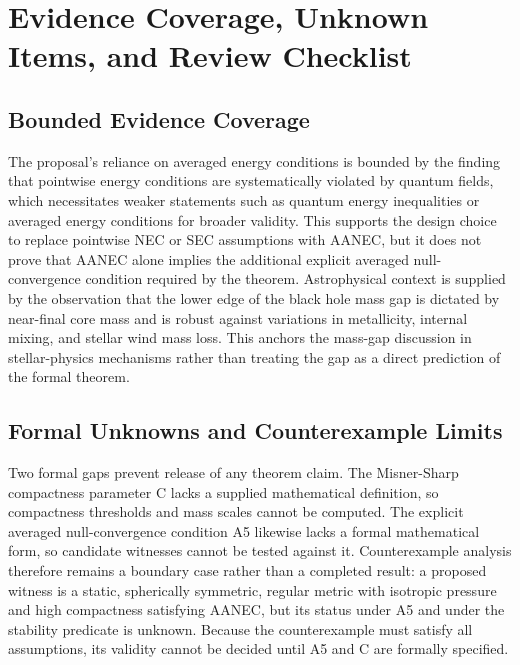 \documentclass[conference]{IEEEtran}
\begin{document}
\section{Evidence Coverage, Unknown Items, and Review Checklist}
\subsection{Bounded Evidence Coverage}
The proposal's reliance on averaged energy conditions is bounded by the finding that pointwise energy conditions are systematically violated by quantum fields, which necessitates weaker statements such as quantum energy inequalities or averaged energy conditions for broader validity. This supports the design choice to replace pointwise NEC or SEC assumptions with AANEC, but it does not prove that AANEC alone implies the additional explicit averaged null-convergence condition required by the theorem. Astrophysical context is supplied by the observation that the lower edge of the black hole mass gap is dictated by near-final core mass and is robust against variations in metallicity, internal mixing, and stellar wind mass loss. This anchors the mass-gap discussion in stellar-physics mechanisms rather than treating the gap as a direct prediction of the formal theorem.~\cite{cite_0ed84243cf171bc4,cite_7a407c865faafd11}

\subsection{Formal Unknowns and Counterexample Limits}
Two formal gaps prevent release of any theorem claim. The Misner-Sharp compactness parameter C lacks a supplied mathematical definition, so compactness thresholds and mass scales cannot be computed. The explicit averaged null-convergence condition A5 likewise lacks a formal mathematical form, so candidate witnesses cannot be tested against it. Counterexample analysis therefore remains a boundary case rather than a completed result: a proposed witness is a static, spherically symmetric, regular metric with isotropic pressure and high compactness satisfying AANEC, but its status under A5 and under the stability predicate is unknown. Because the counterexample must satisfy all assumptions, its validity cannot be decided until A5 and C are formally specified.
\end{document}

